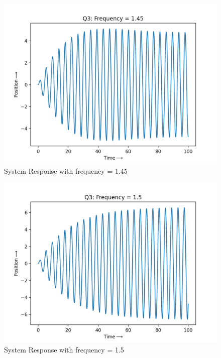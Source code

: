 \documentclass[11pt, a4paper]{article}
\begin{document}
\begin{figure}[tbh!]
\centering
\includegraphics[scale=0.6]{Q3_2.png}
\caption{System Response with frequency = 1.45}
\label{fig:System Response with frequency = 1.45}
\end{figure}

\begin{figure}[tbh!]
\centering
\includegraphics[scale=0.6]{Q3_3.png}
\caption{System Response with frequency = 1.5}
\label{fig:System Response with frequency = 1.5}
\end{figure}
\end{document}
